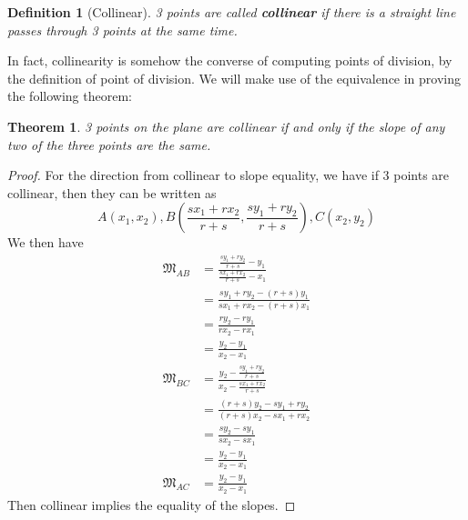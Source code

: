 \documentclass[12pt]{article}
\newtheorem{definition}{Definition}[section]
\newtheorem*{theorem}{Theorem}
\begin{document}
    \begin{definition}[Collinear]
        3 points are called \textbf{collinear} if there is a straight line passes through 3 points at the same time.
    \end{definition}

    In fact, collinearity is somehow the converse of computing points of division, by the definition of point of division. We will make use of the equivalence in proving the following theorem:

    \begin{theorem}
        3 points on the plane are collinear if and only if the slope of any two of the three points are the same.
    \end{theorem}

    \begin{proof}
        For the direction from collinear to slope equality, we have if 3 points are collinear, then they can be written as $$A(x_1,x_2), B(\frac{sx_1+rx_2}{r+s}, \frac{sy_1+ry_2}{r+s}), C(x_2,y_2)$$
        We then have \begin{align*}
            \mathfrak{M}_{AB}&=\frac{\frac{sy_1+ry_2}{r+s}-y_1}{\frac{sx_1+rx_2}{r+s}-x_1}\\
            &=\frac{sy_1+ry_2-(r+s)y_1}{sx_1+rx_2-(r+s)x_1}\\
            &=\frac{ry_2-ry_1}{rx_2-rx_1}\\
            &=\frac{y_2-y_1}{x_2-x_1}\\
            \mathfrak{M}_{BC}&=\frac{y_2-\frac{sy_1+ry_2}{r+s}}{x_2-\frac{sx_1+rx_2}{r+s}}\\
            &=\frac{(r+s)y_2-sy_1+ry_2}{(r+s)x_2-sx_1+rx_2}\\
            &=\frac{sy_2-sy_1}{sx_2-sx_1}\\
            &=\frac{y_2-y_1}{x_2-x_1}\\
            \mathfrak{M}_{AC}&=\frac{y_2-y_1}{x_2-x_1}
        \end{align*}
        Then collinear implies the equality of the slopes.


\end{proof}
\end{document}
